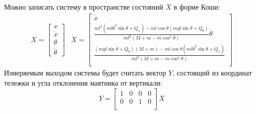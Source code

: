 Можно записать систему в пространстве состояний $X$ в форме Коши: 
\begin{equation}
    \begin{array}{cc}
        X = \begin{bmatrix} 
            x \\
            \dot{x} \\
            \theta \\
            \dot{\theta}
    \end{bmatrix} & 
    \dot{X} = \begin{bmatrix}
        \dot{x} \\
        \frac{ml^2(ml\dot{\theta}^2\sin\theta + Q_x) - ml\cos\theta(mgl\sin\theta + Q_{\theta})}{ml^2(M + m - m\cos^2\theta)}
        \dot{\theta} \\
        \frac{(mgl\sin\theta + Q_{\theta})(M + m) - ml\cos\theta(ml\dot{\theta}^2\sin\theta + Q_x)}{ml^2(M + m - m\cos^2\theta)} \\ 
    \end{bmatrix}
    \end{array}
\end{equation}
Измеряемым выходом системы будет считать вектор $Y$, состоящий из координат тележки и угла отклонения маятника от вертикали:
\begin{equation}
    Y = \begin{bmatrix}
        1 & 0 & 0 & 0 \\
        0 & 0 & 1 & 0 \\ 
    \end{bmatrix} X
\end{equation}

